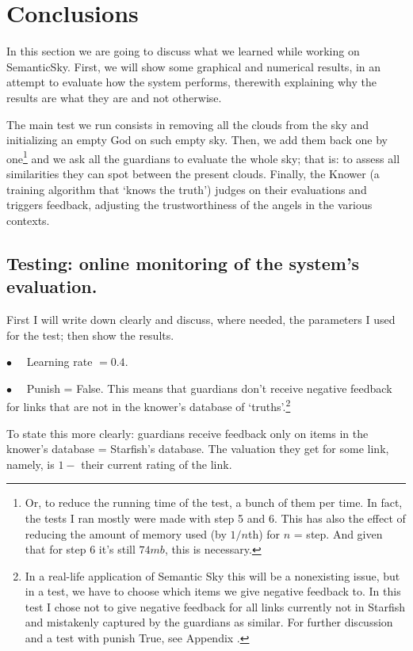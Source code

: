 \documentclass[11pt]{article}
\begin{document}
\section{Conclusions}

In this section we are going to discuss what we learned while working on SemanticSky.
First, we will show some graphical and numerical results, in an attempt to evaluate how the system performs, therewith explaining why the results are what they are and not otherwise.

The main test we run consists in removing all the clouds from the sky and initializing an empty God on such empty sky. Then, we add them back one by one\footnote{Or, to reduce the running time of the test, a bunch of them per time. In fact, the tests I ran mostly were made with step 5 and 6. This has also the effect of reducing the amount of memory used (by $1/n$th) for $n$ = step. And given that for step 6 it's still $74mb$, this is necessary.} and we ask all the guardians to evaluate the whole sky; that is: to assess all similarities they can spot between the present clouds. 
Finally, the Knower (a training algorithm that `knows the truth') judges on their evaluations and triggers feedback, adjusting the trustworthiness of the angels in the various contexts.

\subsection{Testing: online monitoring of the system's evaluation.}

First I will write down clearly and discuss, where needed, the parameters I used for the test; then show the results.

$\bullet \quad$ Learning rate $= 0.4$.

$\bullet \quad$ Punish = False. This means that guardians don't receive negative feedback for links that are not in the knower's database of `truths'.\footnote{In a real-life application of Semantic Sky this will be a nonexisting issue, but in a test, we have to choose which items we give negative feedback to. In this test I chose not to give negative feedback for all links currently not in Starfish and mistakenly captured by the guardians as similar. For further discussion and a test with punish True, see Appendix .}

To state this more clearly: guardians receive feedback only on items in the knower's database = Starfish's database. The valuation they get for some link, namely, is $1 - $ their current rating of the link.
\end{document}

